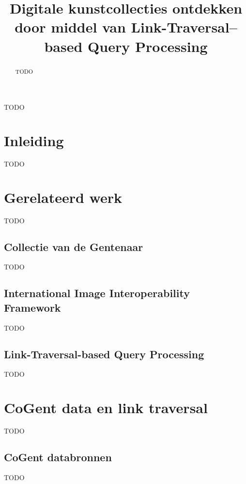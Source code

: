 \documentclass[conference]{IEEEtran}
\begin{document}

\title{Digitale kunstcollecties ontdekken door middel van Link-Traversal–based Query Processing}

\author{
}

\maketitle

\begin{abstract}
TODO
\end{abstract}

\begin{IEEEkeywords}
TODO
\end{IEEEkeywords}

\section*{Inleiding}
TODO

\section{Gerelateerd werk}
TODO

\subsection{Collectie van de Gentenaar}
TODO

\subsection{International Image Interoperability Framework}
TODO

\subsection{Link-Traversal-based Query Processing}
TODO

\section{CoGent data en link traversal}
TODO

\subsection{CoGent databronnen}
TODO
\end{document}
